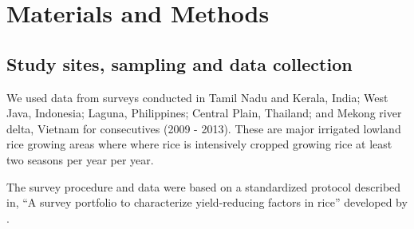 \section*{Materials and Methods}

\subsection*{Study sites, sampling and data collection}
We used data from surveys conducted in Tamil Nadu  and Kerala, India; West Java, Indonesia; Laguna, Philippines; Central Plain, Thailand; and Mekong river delta, Vietnam for consecutives (2009 - 2013). These are major irrigated lowland rice growing areas where where rice is intensively cropped growing rice at least two seasons per year per year. 

The survey procedure and data were based on a standardized protocol described  in, ``A survey portfolio to characterize yield-reducing factors in rice'' developed by \citet{Savarysurvey2009}.